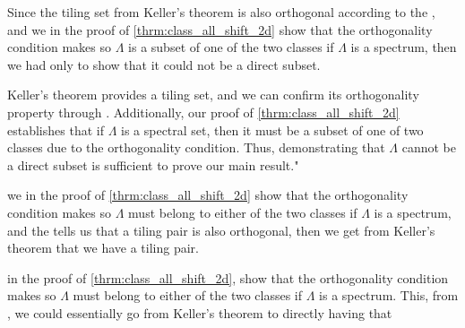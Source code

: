 \documentclass[../thesis.tex]{subfiles}
\begin{document}
\begin{remark}
    Since the tiling set from Keller's theorem is also orthogonal according to the , and we in the proof of \cref{thrm:class_all_shift_2d} show that the orthogonality condition makes so $\Lambda$ is a subset of one of the two classes if $\Lambda$ is a spectrum, then we had only to show that it could not be a direct subset.  
    
    Keller's theorem provides a tiling set, and we can confirm its orthogonality property through . Additionally, our proof of \cref{thrm:class_all_shift_2d} establishes that if $\Lambda$ is a spectral set, then it must be a subset of one of two classes due to the orthogonality condition. Thus, demonstrating that $\Lambda$ cannot be a direct subset is sufficient to prove our main result."
    
    
    we in the proof of \cref{thrm:class_all_shift_2d} show that the orthogonality condition makes so $\Lambda$ must belong to either of the two classes if $\Lambda$ is a spectrum, and the  tells us that a tiling pair is also orthogonal, then we get from Keller's theorem that we have a tiling pair. 
    
    in the proof of \cref{thrm:class_all_shift_2d}, show that the orthogonality condition makes so $\Lambda$ must belong to either of the two classes if $\Lambda$ is a spectrum. This, from , we could essentially go from Keller's theorem to directly having that  

\end{remark}




\end{document}
